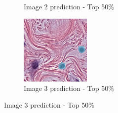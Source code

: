 \begin{figure}[H]
\begin{subfigure}[b]{0.32\textwidth}
    \caption{Image 2 prediction - Top 50\%}
  \end{subfigure}\hfill
  \begin{subfigure}[b]{0.32\textwidth}
    \centering
    \includegraphics[width=\linewidth]{assets/images/for_presentation/exp3-3-pred-top50.png}
    \caption{Image 3 prediction - Top 50\%}
  \end{subfigure}

  \par\vspace{0.5em}
  

\end{figure}
